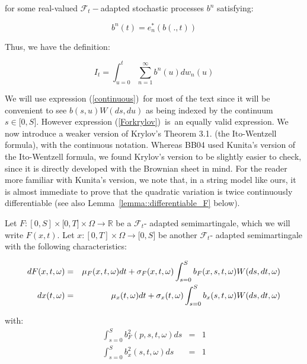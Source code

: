 \documentclass{article}
\begin{document}
for some real-valued $\mathcal{F}_{t}-$adapted stochastic processes $b^{n}$
satisfying:

\begin{equation*}
b^{n}(t)=e_{n}^{\ast }(b(.,t))
\end{equation*}

Thus, we have the definition:

\begin{equation}
I_{t}=\int_{u=0}^{t}\sum_{n=1}^{\infty }b^{n}(u)dw_{n}(u)  \label{Forkrylov}
\end{equation}

We will use expression (\ref{continuous})\ for most of the text since it
will be convenient to see $b(s,u)W(ds,du)$ as being indexed by the continuum
$s\in \lbrack 0,S]$. However expression (\ref{Forkrylov})\ is\ an equally
valid expression. We now introduce a weaker version of Krylov's \cite{Kry09}
Theorem 3.1. (the Ito-Wentzell formula), with the continuous notation.
Whereas BB04 used Kunita's \cite{Kun97} version of the Ito-Wentzell formula, we found
Krylov's version to be slightly easier to check, since it is directly
developed with the Brownian sheet in mind. For the reader more familiar with
Kunita's version, we note that, in a string model like ours, it is almost
immediate to prove that the quadratic variation is twice continuously
differentiable (see also Lemma~\ref{lemma::differentiable_F} below).

\bigskip

Let $F:[0,S]\times \lbrack 0,T]\times \Omega \rightarrow \mathbb{R}$ be a $%
\mathcal{F}_{t}$- adapted semimartingale, which we will write $F(x,t)$. Let $%
x:[0,T]\times \Omega \rightarrow \lbrack 0,S]$ be another $\mathcal{F}_{t}$-
adapted semimartingale with the following characteristics:

\begin{eqnarray}
dF(x,t,\omega ) &=&\mu _{F}(x,t,\omega )dt+\sigma _{F}(x,t,\omega
)\int_{s=0}^{S}b_{F}(x,s,t,\omega )W(ds,dt,\omega )  \label{dQ} \\
dx(t,\omega ) &=&\mu _{x}(t,\omega )dt+\sigma _{x}(t,\omega
)\int_{s=0}^{S}b_{x}(s,t,\omega )W(ds,dt,\omega )  \notag
\end{eqnarray}

with:%
\begin{eqnarray*}
\int_{s=0}^{S}b_{F}^{2}(p,s,t,\omega )ds &=&1 \\
\int_{s=0}^{S}b_{x}^{2}(s,t,\omega )ds &=&1
\end{eqnarray*}%
\bigskip
\end{document}
